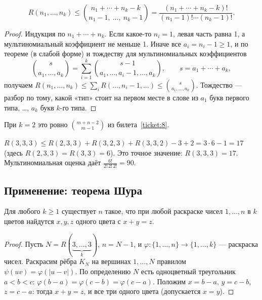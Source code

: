 \begin{cor}
\[
R(n_1,\ldots,n_k)\le\binom{n_1+\cdots+n_k-k}{n_1-1,\ \ldots,\ n_k-1}
=\frac{(n_1+\cdots+n_k-k)!}{(n_1-1)!\cdots(n_k-1)!}.
\]
\end{cor}
\begin{proof}
Индукция по \(n_1+\cdots+n_k\). Если какое-то \(n_i=1\), левая часть равна 1, а
мультиномиальный коэффициент не меньше 1. Иначе все \(a_i=n_i-1\ge1\), и
по теореме (в слабой форме) и тождеству для мультиномиальных коэффициентов
\[
\binom{s}{a_1,\ldots,a_k}=\sum_{i=1}^{k}\binom{s-1}{a_1,\ldots,a_i-1,\ldots,a_k},
\qquad s=a_1+\cdots+a_k,
\]
получаем \(R(n_1,\ldots,n_k)\le\sum_iR(\ldots,n_i-1,\ldots)\le\binom{s}{a_1,\ldots,a_k}\).
Тождество — разбор по тому, какой «тип» стоит на первом месте в слове из
\(a_1\) букв первого типа, \ldots, \(a_k\) букв \(k\)-го типа.
\end{proof}
При \(k=2\) это ровно \(\binom{m+n-2}{m-1}\) из билета~\ref{ticket:8}.
\begin{example}
\(R(3,3,3)\le R(2,3,3)+R(3,2,3)+R(3,3,2)-3+2=3\cdot6-1=17\) (здесь
\(R(2,3,3)=R(3,3)=6\)). Это точное значение: \(R(3,3,3)=17\).
Мультиномиальная оценка даёт \(\frac{6!}{2!\,2!\,2!}=90\).
\end{example}

\subsection*{Применение: теорема Шура}
\begin{theorem}[Шур, 1916]
Для любого \(k\ge1\) существует \(n\) такое, что при любой раскраске чисел
\(1,\ldots,n\) в \(k\) цветов найдутся \(x,y,z\) одного цвета с \(x+y=z\).
\end{theorem}
\begin{proof}
Пусть \(N=R(\underbrace{3,\ldots,3}_k)\), \(n=N-1\), и \(\varphi\colon\{1,\ldots,n\}\to\{1,\ldots,k\}\) —
раскраска чисел. Раскрасим рёбра \(K_N\) на вершинах \(1,\ldots,N\) правилом
\(\psi(uv)=\varphi(|u-v|)\). По определению \(N\) есть одноцветный треугольник
\(a<b<c\): \(\varphi(b-a)=\varphi(c-b)=\varphi(c-a)\). Положим \(x=b-a\), \(y=c-b\),
\(z=c-a\): тогда \(x+y=z\), и все три одного цвета (допускается \(x=y\)).
\end{proof}

